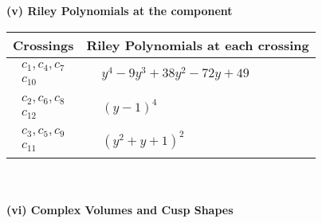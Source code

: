 \documentclass[1p]{elsarticle_modified}
\theoremstyle{definition}
\begin{document}
\newpage\renewcommand{\arraystretch}{1}
\flushleft \textbf{(v) Riley Polynomials at the component}\newline \\
\begin{tabular}{m{50pt}|m{274pt}}
Crossings & \hspace{64pt}Riley Polynomials at each crossing \\
\hline $$\begin{aligned}c_{1},c_{4},c_{7}\\c_{10}\end{aligned}$$&$\begin{aligned}
&y^4-9 y^3+38 y^2-72 y+49
\end{aligned}$\\
\hline $$\begin{aligned}c_{2},c_{6},c_{8}\\c_{12}\end{aligned}$$&$\begin{aligned}
&(y-1)^4
\end{aligned}$\\
\hline $$\begin{aligned}c_{3},c_{5},c_{9}\\c_{11}\end{aligned}$$&$\begin{aligned}
&(y^2+y+1)^2
\end{aligned}$\\
\hline
\end{tabular}\\~\\
\newpage\flushleft \textbf{(vi) Complex Volumes and Cusp Shapes}
\end{document}
